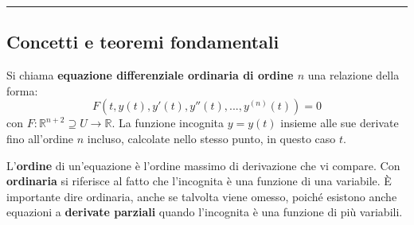 \documentclass[a4paper]{article}
\newcommand{\longline}{\noindent\rule{\textwidth}{0.4pt}}
\newcommand{\definition}[1]{\textcolor{Red3}{\textbf{#1}}}
\begin{document}
	\longline

	\subsection{Concetti e teoremi fondamentali}

	Si chiama \definition{equazione differenziale ordinaria di ordine $n$} una relazione della forma:
	\begin{equation}\label{eq: equazione differenziale ordinaria di ordine n}
		F(t, y\left(t\right), y'\left(t\right), y''\left(t\right), ..., y^{\left(n\right)}\left(t\right)) = 0
	\end{equation}
	con $F: \mathbb{R}^{n+2} \supseteq U \rightarrow \mathbb{R}$. La funzione incognita $y=y\left(t\right)$ insieme alle sue derivate fino all'ordine $n$ incluso, calcolate nello stesso punto, in questo caso $t$.\newline

	\noindent
	L'\definition{ordine} di un'equazione è l'ordine massimo di derivazione che vi compare. Con \definition{ordinaria} si riferisce al fatto che l'incognita è una funzione di una variabile. È importante dire ordinaria, anche se talvolta viene omesso, poiché esistono anche equazioni a \definition{derivate parziali} quando l'incognita è una funzione di più variabili.\newline
\end{document}
